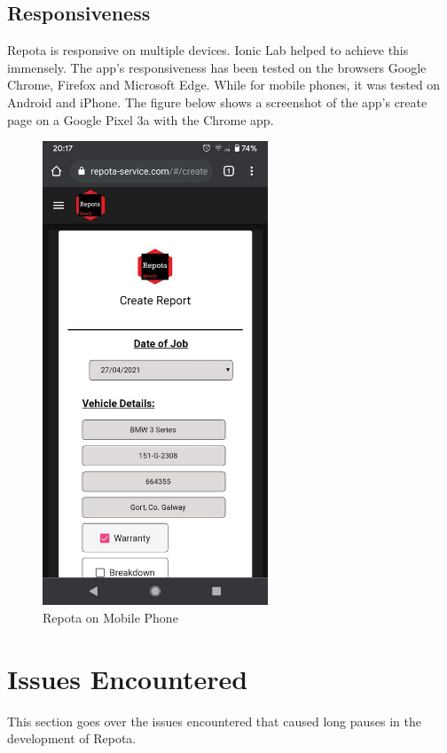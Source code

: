 \subsection{Responsiveness}
Repota is responsive on multiple devices. Ionic Lab helped to achieve this immensely. The app's responsiveness has been tested on the browsers Google Chrome, Firefox and Microsoft Edge. While for mobile phones, it was tested on Android and iPhone. The figure below shows a screenshot of the app's create page on a Google Pixel 3a with the Chrome app.

\begin{figure}[H]
    \centering
    \caption{Repota on Mobile Phone}
    \label{image:mobileHome}
    \includegraphics[width=0.6\textwidth]{images/repota/UI/create-mobile-phone.jpg}
\end{figure}

\newpage
\section{Issues Encountered}
This section goes over the issues encountered that caused long pauses in the development of Repota.

